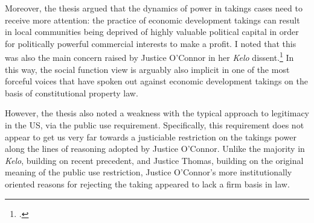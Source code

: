 {%



Moreover, the thesis argued that the dynamics of power in takings cases need to receive more attention: the practice of economic development takings can result in local communities being deprived of highly valuable political capital in order for politically powerful commercial interests to make a profit. I noted that this was also the main concern raised by Justice O'Connor in her {\it Kelo} dissent.\footnote{\cite{kelo05}.} In this way, the social function view is arguably also implicit in one of the most forceful voices that have spoken out against economic development takings on the basis of constitutional property law.

However, the thesis also noted a weakness with the typical approach to legitimacy in the US, via the public use requirement. Specifically, this requirement does not appear to get us very far towards a justiciable restriction on the takings power along the lines of reasoning adopted by Justice O'Connor. Unlike the majority in {\it Kelo}, building on recent precedent, and Justice Thomas, building on the original meaning of the public use restriction, Justice O'Connor's more institutionally oriented reasons for rejecting the taking appeared to lack a firm basis in law.

}
